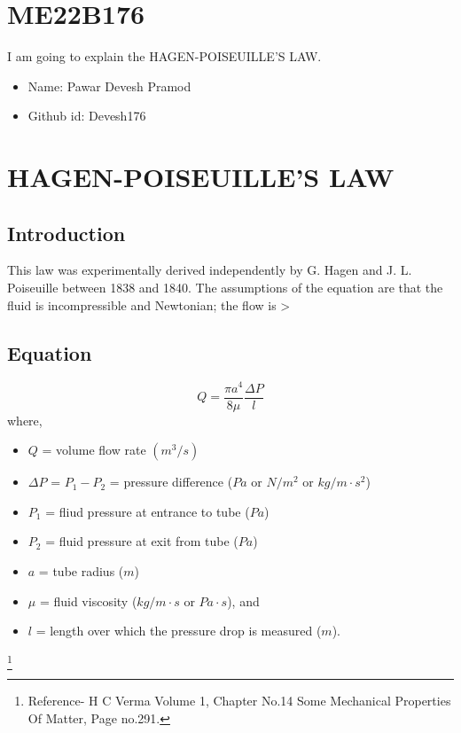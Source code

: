 \section{ME22B176}
I am going to explain the HAGEN-POISEUILLE'S LAW.
\begin{itemize}
\item Name: Pawar Devesh Pramod
\item Github id: Devesh176
\end{itemize}
\section{HAGEN-POISEUILLE'S LAW}
\subsection{Introduction}
This law was experimentally derived independently by G. Hagen and J. L. Poiseuille between 1838 and 1840. The assumptions of the equation are that the fluid is incompressible and Newtonian; the flow is >
\subsection{Equation}
\begin{equation}
    Q = \frac{\pi a^{4}}{8\mu} \frac{\Delta P}{l}
\end{equation}
where,
\begin{itemize}
\item $Q$ = volume flow rate $(m^{3}/s)$
\item $\Delta P$ = $P_{1} - P_{2}$ = pressure difference ($Pa$ or $N/m^{2}$ or $kg/m \cdot s^{2}$)
\item $P_{1}$ = fliud pressure at entrance to tube ($Pa$)
\item $P_{2}$ = fluid pressure at exit from tube ($Pa$)
\item $a$ = tube radius ($m$)
\item $\mu$ = fluid viscosity ($kg/m \cdot s$ or $Pa \cdot s$), and
\item $l$ = length over which the pressure drop is measured ($m$).
\end{itemize}
\footnote{Reference- H C Verma Volume 1, Chapter No.14 Some Mechanical Properties Of Matter, Page no.291.}



